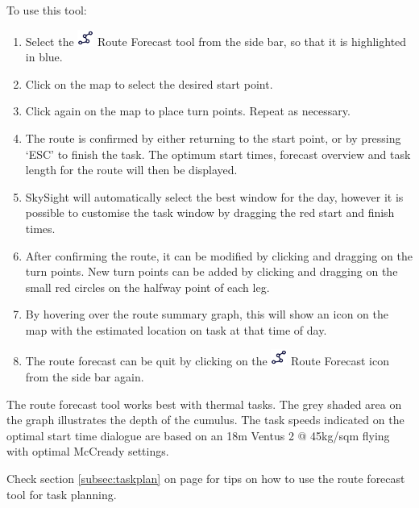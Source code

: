 \documentclass[11pt,a4paper]{article}
\begin{document}
To use this tool:
\begin{enumerate}
\item Select the \includegraphics[height=15pt]{images/icons/route.png} Route Forecast tool from the side bar, so that it is highlighted in blue.
\item Click on the map to select the desired start point. \item Click again on the map to place turn points. Repeat as necessary.
\item The route is confirmed by either returning to the start point, or by pressing `ESC' to finish the task. The optimum start times, forecast overview and task length for the route will then be displayed.
\item SkySight will automatically select the best window for the day, however it is possible to customise the task window by dragging the red start and finish times.
\item After confirming the route, it can be modified by clicking and dragging on the turn points. New turn points can be added by clicking and dragging on the small red circles on the halfway point of each leg.
\item By hovering over the route summary graph, this will show an icon on the map with the estimated location on task at that time of day.
\item The route forecast can be quit by clicking on the \includegraphics[height=15pt]{images/icons/route.png} Route Forecast icon from the side bar again.
\end{enumerate}
The route forecast tool works best with thermal tasks. The grey shaded area on the graph illustrates the depth of the cumulus. The task speeds indicated on the optimal start time dialogue are based on an 18m Ventus 2 @ 45kg/sqm flying with optimal McCready settings.
\begin{tip}
\item Check section \ref{subsec:taskplan} on page \pageref{subsec:taskplan} for tips on how to use the route forecast tool for task planning.
\end{tip}
\end{document}

